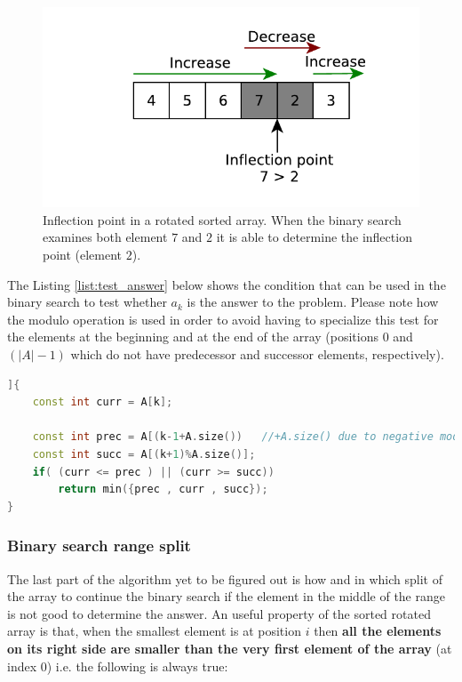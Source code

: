 \begin{figure}
	\centering
	\includegraphics{sources/min_rotated_array/images/inflection_point}
	\caption{Inflection point in a rotated sorted array. When the binary search examines both element $7$ and $2$ it is able to determine the inflection point (element $2$). }
	\label{fig:min_rotated_array:test_element}
\end{figure}

The Listing \ref{list:test_answer} below shows the condition that can be used in the binary search to test whether $a_k$ is the answer to the problem. Please note how the modulo operation is used in order to avoid having to specialize this test for the elements at the beginning and at the end of the array (positions $0$ and $(|A|-1)$ which do not have predecessor and successor elements, respectively).

\begin{lstlisting}[language=c++, caption={Test to verify whether the binary search can stop because an answer has been found.},label=list:test_answer]]{
	const int curr = A[k];

	const int prec = A[(k-1+A.size()) 	//+A.size() due to negative modulo
	const int succ = A[(k+1)%A.size()];
	if( (curr <= prec ) || (curr >= succ))
		return min({prec , curr , succ});
}
\end{lstlisting}

\subsubsection{Binary search range split}

The last part of the algorithm yet to be figured out is how and in which split of the array to continue the binary search if the element in the middle of the range is not good to determine the answer. An useful property of the sorted rotated array is that, when the smallest element is at position $i$ then \textbf{all the elements on its right side are smaller than the very first element of the array} (at index $0$) i.e. the following is always true:

